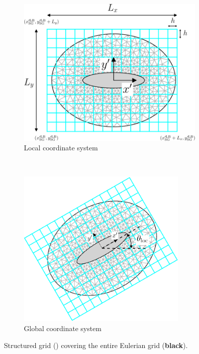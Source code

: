 		\begin{figure}[!b]
	     \centering
	     \begin{subfigure}[t]{0.45\textwidth}
	             \includegraphics[width=\textwidth]{./figures/coupling/interpolateVorticity/structuredGrid_localCoord-crop.pdf}
	             \caption{Local coordinate system}
	             \label{fig:structuredGrid_localCoord}
	     \end{subfigure}%
	     ~ %
	     \begin{subfigure}[t]{0.45\textwidth}
	             \includegraphics[width=0.9\textwidth]{./figures/coupling/interpolateVorticity/structuredGrid_globCoor-crop.pdf}
	             \caption{Global coordinate system}
	             \label{fig:structuredGrid_globCoor}
	     \end{subfigure}
	     
	     \caption{Structured grid ({}) covering the entire Eulerian grid (\textbf{black}).}
	     \label{fig:structuredGrid_Def}
		\end{figure}

